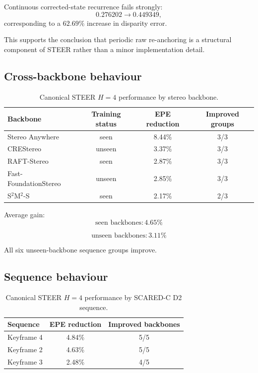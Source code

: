\documentclass[11pt,a4paper]{article}
\begin{document}
Continuous corrected-state recurrence fails strongly:
\[
0.276202
\rightarrow
0.449349,
\]
corresponding to a $62.69\%$ increase in disparity error.

This supports the conclusion that periodic raw re-anchoring is a
structural component of STEER rather than a minor implementation detail.

\subsection*{Cross-backbone behaviour}

\begin{table}[h]
\centering
\small
\begin{tabular}{lccc}
\toprule
Backbone & Training status & EPE reduction & Improved groups \\
\midrule
Stereo Anywhere & seen & 8.44\% & 3/3 \\
CREStereo & unseen & 3.37\% & 3/3 \\
RAFT-Stereo & seen & 2.87\% & 3/3 \\
Fast-FoundationStereo & unseen & 2.85\% & 3/3 \\
S$^2$M$^2$-S & seen & 2.17\% & 2/3 \\
\bottomrule
\end{tabular}
\caption{Canonical STEER $H=4$ performance by stereo backbone.}
\end{table}

Average gain:
\[
\boxed{
\text{seen backbones}: 4.65\%
}
\]

\[
\boxed{
\text{unseen backbones}: 3.11\%
}
\]

All six unseen-backbone sequence groups improve.

\subsection*{Sequence behaviour}

\begin{table}[h]
\centering
\small
\begin{tabular}{lcc}
\toprule
Sequence & EPE reduction & Improved backbones \\
\midrule
Keyframe 4 & 4.84\% & 5/5 \\
Keyframe 2 & 4.63\% & 5/5 \\
Keyframe 3 & 2.48\% & 4/5 \\
\bottomrule
\end{tabular}
\caption{Canonical STEER $H=4$ performance by SCARED-C D2 sequence.}
\end{table}
\end{document}
